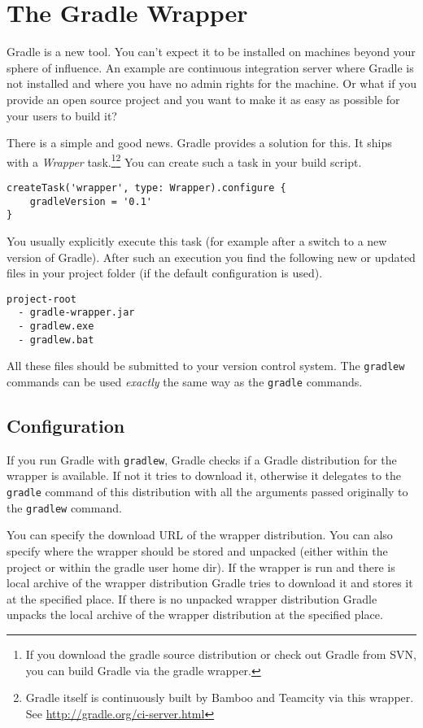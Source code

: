 \chapter{The Gradle Wrapper} %
\label{cha:the_gradle_wrapper}
Gradle is a new tool. You can't expect it to be installed on machines beyond your sphere of influence. An example are continuous integration server where Gradle is not installed and where you have no admin rights for the machine. Or what if you provide an open source project and you want to make it as easy as possible for your users to build it?

There is a simple and good news. Gradle provides a solution for this. It ships with a \emph{Wrapper} task.\footnote{If you download the gradle source distribution or check out Gradle from SVN, you can build Gradle via the gradle wrapper.}\footnote{Gradle itself is continuously built by Bamboo and Teamcity via this wrapper. See \url{http://gradle.org/ci-server.html}} You can create such a task in your build script.
\begin{Verbatim}
createTask('wrapper', type: Wrapper).configure {
    gradleVersion = '0.1'
}	
\end{Verbatim}
You usually explicitly execute this task (for example after a switch to a new version of Gradle). After such an execution you find the following new or updated files in your project folder (if the default configuration is used).
\begin{Verbatim}
project-root
  - gradle-wrapper.jar
  - gradlew.exe
  - gradlew.bat
\end{Verbatim}
\noindent
All these files should be submitted to your version control system. The \texttt{gradlew} commands can be used \emph{exactly} the same way as the \texttt{gradle} commands. 

\section{Configuration} %
\label{sec:configuration}
If you run Gradle with \texttt{gradlew}, Gradle checks if a Gradle distribution for the wrapper is available. If not it tries to download it, otherwise it delegates to the \texttt{gradle} command of this distribution with all the arguments passed originally to the \texttt{gradlew} command.

You can specify the download URL of the wrapper distribution. You can also specify where the wrapper should be stored and unpacked (either within the project or
within the gradle user home dir). If the wrapper is run and there is local archive of the wrapper distribution Gradle tries to download it and stores it at the specified place. If there is no unpacked wrapper distribution Gradle unpacks the local archive of the wrapper distribution at the specified place. 


